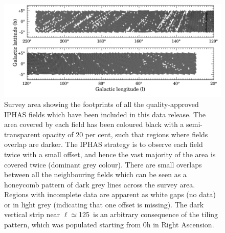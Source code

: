 \documentclass[a4paper,useAMS,usenatbib]{mn2e}
\begin{document}
\begin{figure}
        \includegraphics[width=1\linewidth]{figures/footprint/footprint_small.png}
        \caption{Survey area showing the footprints
        of all the quality-approved IPHAS fields
        which have been included in this data release.
        The area covered by each field has been coloured black
        with a semi-transparent opacity of 20 per cent,
        such that regions where fields overlap are darker.
        The IPHAS strategy is to observe each field twice
        with a small offset,
        and hence the vast majority of the area 
        is covered twice (dominant grey colour).
        There are small overlaps between all the neighbouring fields
        which can be seen as a honeycomb pattern
        of dark grey lines across the survey area.
        Regions with incomplete data are apparent as white gaps (no data) 
        or in light grey (indicating that one offset is missing).
        The dark vertical strip near $\ell \simeq$125\degr\ 
        is an arbitrary consequence of the tiling pattern,
        which was populated starting from 0h in Right Ascension.}
        \label{fig:footprint}
\end{figure}
\end{document}
